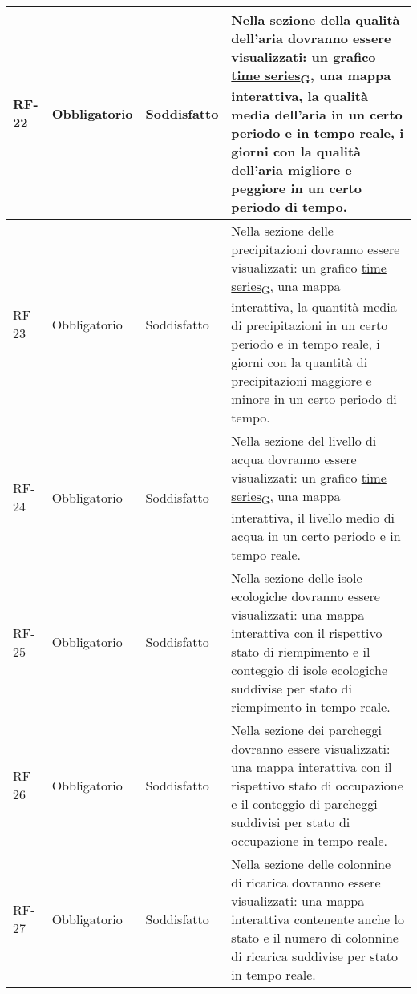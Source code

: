 \begin{longtable}{|>{\centering\arraybackslash}m{}|>{\centering\arraybackslash}m{}|>{\centering\arraybackslash}m{}|>{\centering\arraybackslash}m{}|}
	\\\hline
	RF-22           & Obbligatorio        & Soddisfatto                                                                                                           & Nella sezione della qualità dell'aria dovranno essere visualizzati: un grafico \href{https://7last.github.io/docs/pb/documentazione-interna/glossario\#time-series}{time series\textsubscript{G}}, una mappa interattiva, la qualità media dell'aria in un certo periodo e in tempo reale, i giorni con la qualità dell'aria migliore e peggiore in un certo periodo di tempo.
	\\\hline
	RF-23           & Obbligatorio        & Soddisfatto                                                                                                           & Nella sezione delle precipitazioni dovranno essere visualizzati: un grafico \href{https://7last.github.io/docs/pb/documentazione-interna/glossario\#time-series}{time series\textsubscript{G}}, una mappa interattiva, la quantità media di precipitazioni in un certo periodo e in tempo reale, i giorni con la quantità di precipitazioni maggiore e minore in un certo periodo di tempo.
	\\\hline
	RF-24           & Obbligatorio        & Soddisfatto                                                                                                           & Nella sezione del livello di acqua dovranno essere visualizzati: un grafico \href{https://7last.github.io/docs/pb/documentazione-interna/glossario\#time-series}{time series\textsubscript{G}}, una mappa interattiva, il livello medio di acqua in un certo periodo e in tempo reale.
	\\\hline
	RF-25           & Obbligatorio        & Soddisfatto                                                                                                           & Nella sezione delle isole ecologiche dovranno essere visualizzati: una mappa interattiva con il rispettivo stato di riempimento e il conteggio di isole ecologiche suddivise per stato di riempimento in tempo reale.
	\\\hline
	RF-26           & Obbligatorio        & Soddisfatto                                                                                                           & Nella sezione dei parcheggi dovranno essere visualizzati: una mappa interattiva con il rispettivo stato di occupazione e il conteggio di parcheggi suddivisi per stato di occupazione in tempo reale.
	\\\hline
	RF-27           & Obbligatorio        & Soddisfatto                                                                                                           & Nella sezione delle colonnine di ricarica dovranno essere visualizzati: una mappa interattiva contenente anche lo stato e il numero di colonnine di ricarica suddivise per stato in tempo reale.

\end{longtable}
